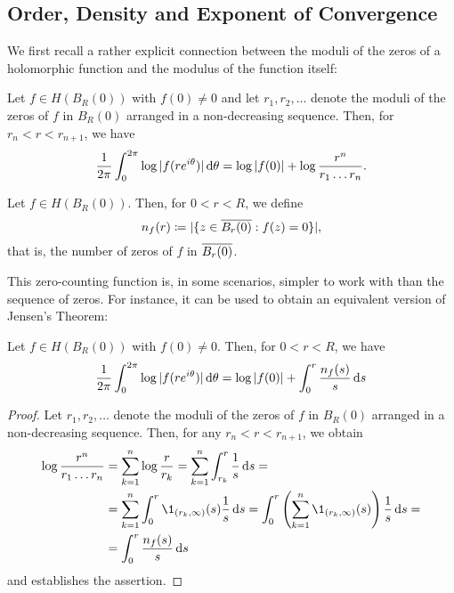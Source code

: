 \subsection{Order, Density and Exponent of Convergence}

We first recall a rather explicit connection between the moduli of the zeros of a holomorphic function and the modulus of the function itself:

\begin{theorem}[Jensen] \label{thm:jensen}
    Let $f \in H(B_R(0))$ with $f(0) \neq 0$ and let $r_1, r_2, \hdots$ denote the moduli of the zeros of $f$ in $B_{R}(0)$ arranged in a non-decreasing sequence. Then, for $r_n < r < r_{n+1}$, we have
    \begin{equation}
        \frac{1}{2 \pi} \int_0^{2\pi} \log \vert f(r e^{i \theta}) \vert \mathop{}\!\mathrm{d} \theta = \log \vert f(0) \vert + \log \frac{r^n}{r_1 \hdots r_n}.
    \end{equation}
\end{theorem}

\begin{definition}
    Let $f \in H(B_R(0))$. Then, for $0 < r < R$, we define
    \begin{equation}
        n_f(r) \coloneqq \vert \{ z \in \overline{B_r(0)} : f(z) = 0 \} \vert,
    \end{equation}
    that is, the number of zeros of $f$ in $\overline{B_{r}(0)}$.
\end{definition}

This zero-counting function is, in some scenarios, simpler to work with than the sequence of zeros. For instance, it can be used to obtain an equivalent version of Jensen's Theorem:

\begin{corollary} \label{cor:jensen-nf}
    Let $f \in H(B_R(0))$ with $f(0) \neq 0$. Then, for $0 < r < R$, we have
    \begin{equation}
        \frac{1}{2 \pi} \int_0^{2\pi} \log \vert f(re^{i \theta}) \vert \mathop{}\!\mathrm{d} \theta = \log \vert f(0) \vert + \int_0^r \frac{n_f(s)}{s} \mathop{}\!\mathrm{d} s
    \end{equation}
\end{corollary}

\begin{proof}
    Let $r_1, r_2, \hdots$ denote the moduli of the zeros of $f$ in $B_{R}(0)$ arranged in a non-decreasing sequence. Then, for any $r_n < r < r_{n+1}$, we obtain
    \begin{align*}
        \log \frac{r^n}{r_1 \hdots r_n} &= \sum_{k=1}^n \log \frac{r}{r_k} = \sum_{k=1}^n \int_{r_k}^r \frac{1}{s} \diff s = \\
        &= \sum_{k=1}^n \int_0^r \1_{(r_k, \infty)}(s) \frac{1}{s} \diff s = \int_0^r \left( \sum_{k=1}^n \1_{(r_k, \infty)}(s) \right) \frac{1}{s} \diff s = \\
        &= \int_0^r \frac{n_f(s)}{s} \diff s
    \end{align*}
    and  establishes the assertion.
\end{proof}

